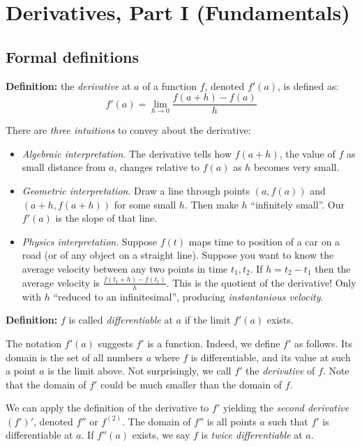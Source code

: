 
\section{Derivatives, Part I (Fundamentals)}

\subsection{Formal definitions}

\textbf{Definition:} the \textit{derivative} at $a$ of a function $f$,
denoted $f'(a)$, is defined as:
\[f'(a)=\lim_{h\to0}\frac{f(a+h)-f(a)}{h}\]

There are \textit{three intuitions} to convey about the derivative:
\begin{itemize}
\item \textit{Algebraic interpretation}. The derivative tells how
  $f(a+h)$, the value of $f$ as small distance from $a$, changes
  relative to $f(a)$ as $h$ becomes very small.
\item \textit{Geometric interpretation}. Draw a line through points
  $(a, f(a))$ and $(a+h, f(a+h))$ for some small $h$. Then make $h$
  ``infinitely small''. Our $f'(a)$ is the slope of that line.
\item \textit{Physics interpretation}. Suppose $f(t)$ maps time to
  position of a car on a road (or of any object on a straight line).
  Suppose you want to know the average velocity between any two points
  in time $t_1, t_2$. If $h=t_2-t_1$ then the average velocity is
  $\frac{f(t_1+h)-f(t_1)}{h}$. This is the quotient of the derivative!
  Only with $h$ ``reduced to an infinitesimal'', producing
  \textit{instantanious velocity}.
\end{itemize}

\textbf{Definition:} $f$ is called \textit{differentiable} at $a$ if
the limit $f'(a)$ exists.

\vs

The notation $f'(a)$ suggests $f'$ is a function. Indeed, we define
$f'$ as follows. Its domain is the set of all numbers $a$ where $f$ is
differentiable, and its value at such a point $a$ is the limit above.
Not surprisingly, we call $f'$ the \textit{derivative} of $f$. Note
that the domain of $f'$ could be much smaller than the domain of $f$.

\vs

We can apply the definition of the derivative to $f'$ yielding the
\textit{second derivative} $(f')'$, denoted $f''$ or $f^{(2)}$. The
domain of $f''$ is all points $a$ such that $f'$ is differentiable at
$a$. If $f''(a)$ exists, we say $f$ is \textit{twice differentiable}
at $a$.

